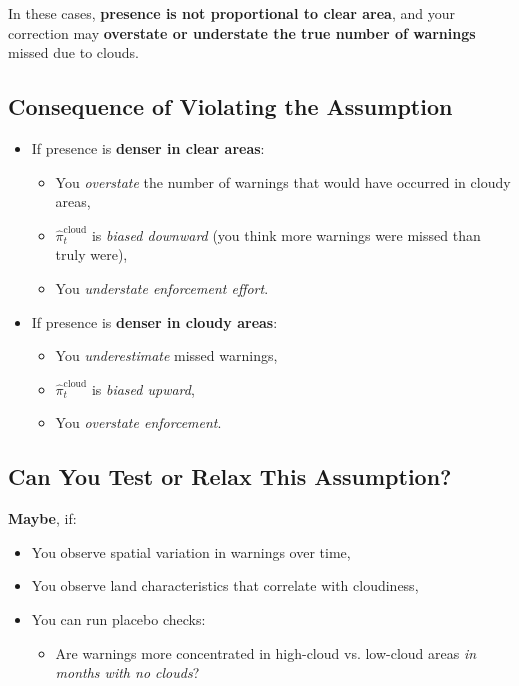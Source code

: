 \documentclass[12pt]{article}
\begin{document}
In these cases, \textbf{presence is not proportional to clear area}, and your correction may \textbf{overstate or understate the true number of warnings} missed due to clouds.

\subsection*{Consequence of Violating the Assumption}

\begin{itemize}
  \item If presence is \textbf{denser in clear areas}:
  \begin{itemize}
    \item You \textit{overstate} the number of warnings that would have occurred in cloudy areas,
    \item $\widehat{\pi}^{\text{cloud}}_t$ is \textit{biased downward} (you think more warnings were missed than truly were),
    \item You \textit{understate enforcement effort}.
  \end{itemize}
  \item If presence is \textbf{denser in cloudy areas}:
  \begin{itemize}
    \item You \textit{underestimate} missed warnings,
    \item $\widehat{\pi}^{\text{cloud}}_t$ is \textit{biased upward},
    \item You \textit{overstate enforcement}.
  \end{itemize}
\end{itemize}

\subsection*{Can You Test or Relax This Assumption?}

\textbf{Maybe}, if:

\begin{itemize}
  \item You observe spatial variation in warnings over time,
  \item You observe land characteristics that correlate with cloudiness,
  \item You can run placebo checks:
  \begin{itemize}
    \item Are warnings more concentrated in high-cloud vs. low-cloud areas \textit{in months with no clouds}?
  \end{itemize}
\end{itemize}
 
\end{document}
